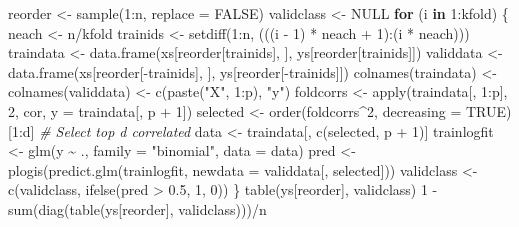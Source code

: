 \documentclass[
]{article}
\newenvironment{Shaded}{\begin{snugshade}}{\end{snugshade}}
\newcommand{\AttributeTok}[1]{\textcolor[rgb]{0.77,0.63,0.00}{#1}}
\newcommand{\CommentTok}[1]{\textcolor[rgb]{0.56,0.35,0.01}{\textit{#1}}}
\newcommand{\ConstantTok}[1]{\textcolor[rgb]{0.00,0.00,0.00}{#1}}
\newcommand{\ControlFlowTok}[1]{\textcolor[rgb]{0.13,0.29,0.53}{\textbf{#1}}}
\newcommand{\DecValTok}[1]{\textcolor[rgb]{0.00,0.00,0.81}{#1}}
\newcommand{\FloatTok}[1]{\textcolor[rgb]{0.00,0.00,0.81}{#1}}
\newcommand{\FunctionTok}[1]{\textcolor[rgb]{0.00,0.00,0.00}{#1}}
\newcommand{\NormalTok}[1]{#1}
\newcommand{\OtherTok}[1]{\textcolor[rgb]{0.56,0.35,0.01}{#1}}
\newcommand{\SpecialCharTok}[1]{\textcolor[rgb]{0.00,0.00,0.00}{#1}}
\newcommand{\StringTok}[1]{\textcolor[rgb]{0.31,0.60,0.02}{#1}}
\begin{document}
\begin{Shaded}
\begin{Highlighting}[]
\NormalTok{reorder }\OtherTok{\textless{}{-}} \FunctionTok{sample}\NormalTok{(}\DecValTok{1}\SpecialCharTok{:}\NormalTok{n, }\AttributeTok{replace =} \ConstantTok{FALSE}\NormalTok{)}
\NormalTok{validclass }\OtherTok{\textless{}{-}} \ConstantTok{NULL}
\ControlFlowTok{for}\NormalTok{ (i }\ControlFlowTok{in} \DecValTok{1}\SpecialCharTok{:}\NormalTok{kfold) \{}
\NormalTok{    neach }\OtherTok{\textless{}{-}}\NormalTok{ n}\SpecialCharTok{/}\NormalTok{kfold}
\NormalTok{    trainids }\OtherTok{\textless{}{-}} \FunctionTok{setdiff}\NormalTok{(}\DecValTok{1}\SpecialCharTok{:}\NormalTok{n, (((i }\SpecialCharTok{{-}} \DecValTok{1}\NormalTok{) }\SpecialCharTok{*}\NormalTok{ neach }\SpecialCharTok{+} \DecValTok{1}\NormalTok{)}\SpecialCharTok{:}\NormalTok{(i }\SpecialCharTok{*}\NormalTok{ neach)))}
\NormalTok{    traindata }\OtherTok{\textless{}{-}} \FunctionTok{data.frame}\NormalTok{(xs[reorder[trainids], ], ys[reorder[trainids]])}
\NormalTok{    validdata }\OtherTok{\textless{}{-}} \FunctionTok{data.frame}\NormalTok{(xs[reorder[}\SpecialCharTok{{-}}\NormalTok{trainids], ], ys[reorder[}\SpecialCharTok{{-}}\NormalTok{trainids]])}
    \FunctionTok{colnames}\NormalTok{(traindata) }\OtherTok{\textless{}{-}} \FunctionTok{colnames}\NormalTok{(validdata) }\OtherTok{\textless{}{-}} \FunctionTok{c}\NormalTok{(}\FunctionTok{paste}\NormalTok{(}\StringTok{"X"}\NormalTok{, }\DecValTok{1}\SpecialCharTok{:}\NormalTok{p),}
        \StringTok{"y"}\NormalTok{)}
\NormalTok{    foldcorrs }\OtherTok{\textless{}{-}} \FunctionTok{apply}\NormalTok{(traindata[, }\DecValTok{1}\SpecialCharTok{:}\NormalTok{p], }\DecValTok{2}\NormalTok{, cor, }\AttributeTok{y =}\NormalTok{ traindata[, p }\SpecialCharTok{+}
        \DecValTok{1}\NormalTok{])}
\NormalTok{    selected }\OtherTok{\textless{}{-}} \FunctionTok{order}\NormalTok{(foldcorrs}\SpecialCharTok{\^{}}\DecValTok{2}\NormalTok{, }\AttributeTok{decreasing =} \ConstantTok{TRUE}\NormalTok{)[}\DecValTok{1}\SpecialCharTok{:}\NormalTok{d]  }\CommentTok{\# Select top d correlated }
\NormalTok{    data }\OtherTok{\textless{}{-}}\NormalTok{ traindata[, }\FunctionTok{c}\NormalTok{(selected, p }\SpecialCharTok{+} \DecValTok{1}\NormalTok{)]}
\NormalTok{    trainlogfit }\OtherTok{\textless{}{-}} \FunctionTok{glm}\NormalTok{(y }\SpecialCharTok{\textasciitilde{}}\NormalTok{ ., }\AttributeTok{family =} \StringTok{"binomial"}\NormalTok{, }\AttributeTok{data =}\NormalTok{ data)}
\NormalTok{    pred }\OtherTok{\textless{}{-}} \FunctionTok{plogis}\NormalTok{(}\FunctionTok{predict.glm}\NormalTok{(trainlogfit, }\AttributeTok{newdata =}\NormalTok{ validdata[, selected]))}
\NormalTok{    validclass }\OtherTok{\textless{}{-}} \FunctionTok{c}\NormalTok{(validclass, }\FunctionTok{ifelse}\NormalTok{(pred }\SpecialCharTok{\textgreater{}} \FloatTok{0.5}\NormalTok{, }\DecValTok{1}\NormalTok{, }\DecValTok{0}\NormalTok{))}
\NormalTok{\}}
\FunctionTok{table}\NormalTok{(ys[reorder], validclass)}
\DecValTok{1} \SpecialCharTok{{-}} \FunctionTok{sum}\NormalTok{(}\FunctionTok{diag}\NormalTok{(}\FunctionTok{table}\NormalTok{(ys[reorder], validclass)))}\SpecialCharTok{/}\NormalTok{n}
\end{Highlighting}
\end{Shaded}
\end{document}
